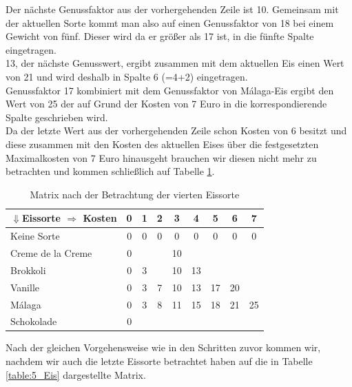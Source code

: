 \documentclass[a4paper, 12pt]{article}
\begin{document}
Der nächste Genussfaktor aus der vorhergehenden Zeile ist 10. Gemeinsam mit
der aktuellen Sorte kommt man also auf einen Genussfaktor von 18 bei einem
Gewicht von fünf. Dieser wird da er größer als 17 ist, in die fünfte Spalte
eingetragen.\\

13, der nächste Genusswert, ergibt zusammen mit dem aktuellen Eis einen Wert
von 21 und wird deshalb in Spalte 6 (=4+2) eingetragen.\\

Genussfaktor 17 kombiniert mit dem Genussfaktor von Málaga-Eis ergibt den Wert
von 25 der auf Grund der Kosten von 7 Euro in die korrespondierende Spalte
geschrieben wird.\\

Da der letzte Wert aus der vorhergehenden Zeile schon Kosten von 6 besitzt und
diese zusammen mit den Kosten des aktuellen Eises über die festgesetzten
Maximalkosten von 7 Euro hinausgeht brauchen wir diesen nicht mehr zu
betrachten und kommen schließlich auf Tabelle \ref{table:4_Eis}.

\begin{table}[H]
	\begin{center}
		\begin{tabular}{l|cccccccc}
			$⇓$Eissorte $⇒$ Kosten & 0 & 1 & 2 & 3 & 4 & 5 &
			6 & 7\\
			\hline
			Keine Sorte			& 0 & 0 & 0 & 0	 &	0 &	 0 & 0 & 0	 \\
			Creme de la Creme	& 0 &	&	& 10 &	  &	   &	&	 \\
			Brokkoli			& 0 & 3 &	& 10 & 13 &	   &	&	 \\
			Vanille				& 0 & 3 & 7 & 10 & 13 & 17 & 20 &	 \\
			Málaga				& 0 & 3 & 8 & 11 & 15 & 18 & 21 & 25 \\
			Schokolade			& 0 &	&	&	 &	  &	   &	&	 \\
		\end{tabular}
	\end{center}
\caption{Matrix nach der Betrachtung der vierten Eissorte}
\label{table:4_Eis}
\end{table}

Nach der gleichen Vorgehensweise wie in den Schritten zuvor kommen wir,
nachdem wir auch die letzte Eissorte betrachtet haben auf die in Tabelle
\ref{table:5_Eis} dargestellte Matrix.
\end{document}
